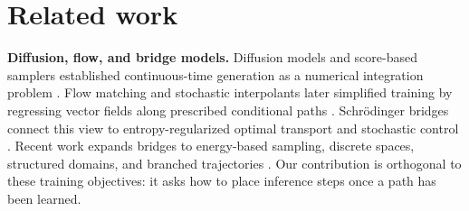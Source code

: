 \documentclass{article}
\theoremstyle{plain}
\theoremstyle{definition}
\theoremstyle{remark}
\begin{document}




\section{Related work}
\label{sec:related}

\textbf{Diffusion, flow, and bridge models.} Diffusion models and score-based samplers established continuous-time generation as a numerical integration problem \citep{ho2020ddpm,kingma2021vdm,karras2022edm}. Flow matching and stochastic interpolants later simplified training by regressing vector fields along prescribed conditional paths \citep{lipman2023flow,albergo2023building,tong2024cfm,liu2023rectified}. Schr\"odinger bridges connect this view to entropy-regularized optimal transport and stochastic control \citep{schrodinger1931,schrodinger1932,leonard2014schrodinger,debortoli2021dsb,liu2023i2sb,tong2024simulation}. Recent work expands bridges to energy-based sampling, discrete spaces, structured domains, and branched trajectories \citep{liu2025asbs,tamogashev2026dataenergy,ksenofontov2025categorical,tang2026branched,wyrwal2026topological}. Our contribution is orthogonal to these training objectives: it asks how to place inference steps once a path has been learned.
\end{document}
